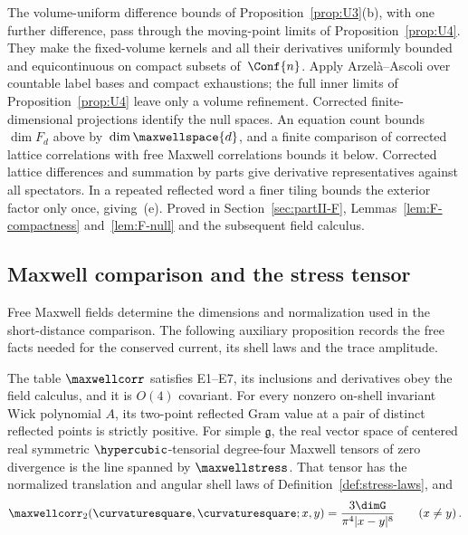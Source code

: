 The volume-uniform difference bounds of Proposition~\ref{prop:U3}\textup{(b)}, with one further difference, pass through the moving-point limits of Proposition~\ref{prop:U4}. They make the fixed-volume kernels and all their derivatives uniformly bounded and equicontinuous on compact subsets of~$\Conf{n}$. Apply Arzelà--Ascoli over countable label bases and compact exhaustions; the full inner limits of Proposition~\ref{prop:U4} leave only a volume refinement. Corrected finite-dimensional projections identify the null spaces. An equation count bounds~$\dim F_d$ above by~$\dim\maxwellspace{d}$, and a finite comparison of corrected lattice correlations with free Maxwell correlations bounds it below. Corrected lattice differences and summation by parts give derivative representatives against all spectators. In a repeated reflected word a finer tiling bounds the exterior factor only once, giving~\textup{(e)}. Proved in Section~\ref{sec:partII-F}, Lemmas~\ref{lem:F-compactness} and~\ref{lem:F-null} and the subsequent field calculus.

\subsection{Maxwell comparison and the stress tensor}

Free Maxwell fields determine the dimensions and normalization used in the
short-distance comparison. The following auxiliary proposition records the
free facts needed for the conserved current, its shell laws and the trace
amplitude.

\begin{proposition}\label{prop:free-maxwell}
The table $\maxwellcorr$ satisfies E1–E7, its inclusions and derivatives obey the field calculus, and it is $O(4)$ covariant. For every nonzero on-shell invariant Wick polynomial $A$, its two-point reflected Gram value at a pair of distinct reflected points is strictly positive. For simple $\mathfrak g$, the real vector space of centered real symmetric $\hypercubic$-tensorial degree-four Maxwell tensors of zero divergence is the line spanned by $\maxwellstress$. That tensor has the normalized translation and angular shell laws of Definition~\ref{def:stress-laws}, and
\begin{equation}\label{eq:free-maxwell-1}
\maxwellcorr_2(\curvaturesquare,\curvaturesquare;x,y)=\frac{3\dimG}{\pi^4|x-y|^8}\qquad(x\ne y)\,.
\end{equation}
\end{proposition}

